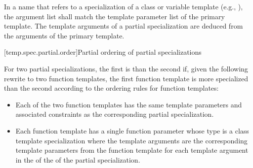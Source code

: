 \pnum
In a name that refers to a specialization of a class or variable template
(e.g., ),
the argument list shall match the template parameter list of the primary
template.
The template arguments of a partial specialization are deduced from the arguments
of the primary template.

[temp.spec.partial.order]{Partial ordering of partial specializations}

\pnum
{}%
For two partial specializations,
the first is  than the second if, given the following
rewrite to two function templates, the first function template is more
specialized than the second according to the ordering rules for function
templates:

\begin{itemize}
\item
Each of the two
function templates has the same template parameters
and associated constraints
as the corresponding partial specialization.
\item
Each function template
has a single function parameter
whose type is a class template specialization where the template arguments
are the corresponding template parameters from the function template
for each template argument
in the 
of the 
of the partial specialization.
\end{itemize}

